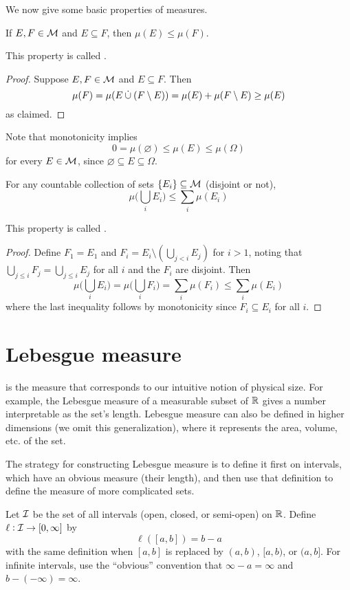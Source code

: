 \documentclass{article}
\begin{document}
We now give some basic properties of measures.
\begin{proposition}
If $E, F \in \mathcal{M}$ and $E \subseteq F$, then $\mu(E) \leq \mu(F)$.
\end{proposition}
This property is called .
\begin{proof}
Suppose $E, F \in \mathcal{M}$ and $E \subseteq F$. Then
\[\mu(F) = \mu(E \mathbin{\dot{\cup}} (F \setminus E)) = \mu(E) + \mu(F \setminus E) \geq \mu(E)\]
as claimed.
\end{proof}
Note that monotonicity implies
\[0 = \mu(\varnothing) \leq \mu(E) \leq \mu(\Omega)\]
for every $E \in \mathcal{M}$, since $\varnothing \subseteq E \subseteq \Omega$.

\begin{proposition}
For any countable collection of sets $\{E_i\} \subseteq \mathcal{M}$ (disjoint or not),
\[\mu\bigg(\bigcup_i E_i\bigg) \leq \sum_i \mu(E_i)\]
\end{proposition}
This property is called .
\begin{proof}
Define $F_1 = E_1$ and $F_i = E_i \setminus (\bigcup_{j < i} E_j)$ for $i > 1$, noting that $\bigcup_{j \leq i} F_j = \bigcup_{j \leq i} E_j$ for all $i$ and the $F_i$ are disjoint.
Then
\[\mu\bigg(\bigcup_i E_i\bigg) = \mu\bigg(\bigcup_i F_i\bigg) = \sum_i \mu(F_i) \leq \sum_i \mu(E_i)\]
where the last inequality follows by monotonicity since $F_i \subseteq E_i$ for all $i$.
\end{proof}

\section{Lebesgue measure}
 is the measure that corresponds to our intuitive notion of physical size.
For example, the Lebesgue measure of a measurable subset of $\mathbb{R}$ gives a number interpretable as the set's length.
Lebesgue measure can also be defined in higher dimensions (we omit this generalization), where it represents the area, volume, etc. of the set.

The strategy for constructing Lebesgue measure is to define it first on intervals, which have an obvious measure (their length), and then use that definition to define the measure of more complicated sets.

Let $\mathcal{I}$ be the set of all intervals (open, closed, or semi-open) on $\mathbb{R}$.
Define $\ell : \mathcal{I} \to [0,\infty]$ by
\[\ell([a,b]) = b - a\]
with the same definition when $[a,b]$ is replaced by $(a,b)$, $[a,b)$, or $(a,b]$.
For infinite intervals, use the ``obvious'' convention that $\infty-a = \infty$ and $b-(-\infty) = \infty$.
\end{document}
